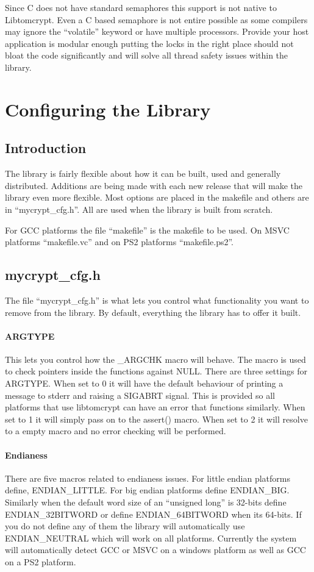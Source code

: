 \documentclass{book}
\begin{document}
Since C does not have standard semaphores this support is not native to Libtomcrypt.  Even a C based semaphore is not entire
possible as some compilers may ignore the ``volatile'' keyword or have multiple processors.  Provide your host application
is modular enough putting the locks in the right place should not bloat the code significantly and will solve all thread
safety issues within the library.

\chapter{Configuring the Library}
\section{Introduction}
The library is fairly flexible about how it can be built, used and generally distributed.  Additions are being made with
each new release that will make the library even more flexible.  Most options are placed in the makefile and others
are in ``mycrypt\_cfg.h''.  All are used when the library is built from scratch.

For GCC platforms the file ``makefile'' is the makefile to be used.  On MSVC platforms ``makefile.vc'' and on PS2 platforms
``makefile.ps2''.

\section{mycrypt\_cfg.h}
The file ``mycrypt\_cfg.h'' is what lets you control what functionality you want to remove from the library.  By default,
everything the library has to offer it built.  

\subsubsection{ARGTYPE}
This lets you control how the \_ARGCHK macro will behave.  The macro is used to check pointers inside the functions against
NULL.  There are three settings for ARGTYPE.  When set to 0 it will have the default behaviour of printing a message to 
stderr and raising a SIGABRT signal.  This is provided so all platforms that use libtomcrypt can have an error that functions
similarly.  When set to 1 it will simply pass on to the assert() macro.  When set to 2 it will resolve to a empty macro
and no error checking will be performed.

\subsubsection{Endianess}
There are five macros related to endianess issues.  For little endian platforms define, ENDIAN\_LITTLE.  For big endian
platforms define ENDIAN\_BIG.  Similarly when the default word size of an ``unsigned long'' is 32-bits define ENDIAN\_32BITWORD
or define ENDIAN\_64BITWORD when its 64-bits.  If you do not define any of them the library will automatically use ENDIAN\_NEUTRAL
which will work on all platforms.  Currently the system will automatically detect GCC or MSVC on a windows platform as well
as GCC on a PS2 platform.
\end{document}
